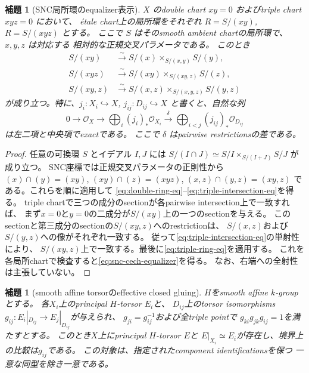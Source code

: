 \documentclass[uplatex,dvipdfmx,11pt]{jsarticle}
\numberwithin{equation}{section}
\theoremstyle{plain}
\newtheorem{lemma}[theorem]{補題}
\theoremstyle{definition}
\theoremstyle{remark}
\newcommand{\OO}{\mathcal O}
\begin{document}
\begin{lemma}[SNC局所環のequalizer表示]
\label{lem:snc-ring-equalizer}
$X$ のdouble chart $xy=0$ およびtriple chart $xyz=0$ において、
étale chart上の局所環をそれぞれ $R=S/(xy)$, $R=S/(xyz)$ とする。
ここで $S$ はそのsmooth ambient chartの局所環で、$x,y,z$ は対応する
相対的な正規交叉パラメータである。
このとき
\begin{align}
S/(xy)&\xrightarrow{\sim}
 S/(x)\times_{S/(x,y)}S/(y),\label{eq:double-ring-eq}\\
S/(xyz)&\xrightarrow{\sim}
 S/(xy)\times_{S/(xy,z)}S/(z),\label{eq:triple-ring-eq}\\
S/(xy,z)&\xrightarrow{\sim}
 S/(x,z)\times_{S/(x,y,z)}S/(y,z)\label{eq:triple-intersection-eq}
\end{align}
が成り立つ。特に、$j_i:X_i\hookrightarrow X$,
$j_{ij}:D_{ij}\hookrightarrow X$ と書くと、自然な列
\begin{equation}\label{eq:snc-cech-equalizer}
0\longrightarrow\OO_X\longrightarrow
\bigoplus_i(j_i)_*\OO_{X_i}\xrightarrow{\delta}
\bigoplus_{i<j}(j_{ij})_*\OO_{D_{ij}}
\end{equation}
は左二項と中央項でexactである。
ここで $\delta$ はpairwise restrictionsの差である。
\end{lemma}

\begin{proof}
任意の可換環 $S$ とイデアル $I,J$ には
$S/(I\cap J)\simeq S/I\times_{S/(I+J)}S/J$ が成り立つ。
SNC座標では正規交叉パラメータの正則性から
$(x)\cap(y)=(xy)$, $(xy)\cap(z)=(xyz)$,
$(x,z)\cap(y,z)=(xy,z)$ である。これらを順に適用して
\eqref{eq:double-ring-eq}--\eqref{eq:triple-intersection-eq}を得る。
triple chartで三つの成分のsectionが各pairwise intersection上で一致すれば、
まず$x=0$と$y=0$の二成分が$S/(xy)$上の一つのsectionを与える。
このsectionと第三成分のsectionの$S/(xy,z)$へのrestrictionは、
$S/(x,z)$および$S/(y,z)$への像がそれぞれ一致する。
従って\eqref{eq:triple-intersection-eq}の単射性により、
$S/(xy,z)$上で一致する。最後に\eqref{eq:triple-ring-eq}を適用する。
これを各局所chartで検査すると\eqref{eq:snc-cech-equalizer}を得る。
なお、右端への全射性は主張していない。
\end{proof}

\begin{lemma}[smooth affine torsorのeffective closed gluing]
\label{lem:snc-torsor-gluing}
$H$をsmooth affine $k$-groupとする。
各$X_i$上のprincipal $H$-torsor $E_i$と、
$D_{ij}$上のtorsor isomorphisms
$g_{ij}:E_i|_{D_{ij}}\to E_j|_{D_{ij}}$が与えられ、
$g_{ji}=g_{ij}^{-1}$および全triple pointで
$g_{ki}g_{jk}g_{ij}=1$を満たすとする。
このとき$X$上にprincipal $H$-torsor $E$と
$E|_{X_i}\simeq E_i$が存在し、境界上の比較は$g_{ij}$である。
この対象は、指定されたcomponent identificationsを保つ
\emph{一意な}同型を除き一意である。
\end{lemma}
\end{document}
